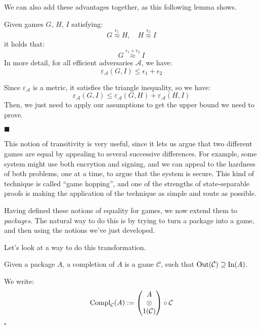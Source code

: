 We can also add these advantages together, as this following
lemma shows.

\begin{lemma}
    Given games $G$, $H$, $I$ satisfying:
    $$
    G \overset{\epsilon_1}{\approx} H, \quad H \overset{\epsilon_2}{\approx} I
    $$
    it holds that:
    $$
    G \overset{\epsilon_1 + \epsilon_2}{\approx} I
    $$
    In more detail, for all efficient adversaries $\mathcal{A}$, we have:
    $$
    \varepsilon_{\mathcal{A}}(G, I) \leq \epsilon_1 + \epsilon_2
    $$

     Since $\varepsilon_{\mathcal{A}}$ is a metric, it
    satisfies the triangle inequality, so we have:
    $$
    \varepsilon_{\mathcal{A}}(G, I) \leq \varepsilon_{\mathcal{A}}(G, H) + \varepsilon_{\mathcal{A}}(H, I)
    $$
    Then, we just need to apply our assumptions to get the upper bound we 
    need to prove.

    $\blacksquare$
\end{lemma}

This notion of transitivity is very useful, since it lets us argue
that two different games are equal by appealing to several successive
differences.
For example, some system might use both encrytion and signing,
and we can appeal to the hardness of both problems, one at a time,
to argue that the system is secure.
This kind of technique is called ``game hopping'',
and one of the strengths of state-separable proofs is making
the application of the technique as simple and route as possible.

Having defined these notions of equality for games,
we now extend them to \emph{packages}.
The natural way to do this is by trying to turn
a package into a game, and then using the notions we've just developed.

Let's look at a way to do this transformation.

\begin{definition}[Completion]
    Given a package $A$, a completion of $A$ is a game $\mathcal{C}$,
    such that $\text{Out}(\mathcal{C}) \supseteq \text{In}(A)$.

    We write:
    $$
    \text{Compl}_{\mathcal{C}}(A) := \begin{pmatrix}
        A\cr
        \otimes\cr
        1(\mathcal{C})
    \end{pmatrix}
    \circ \mathcal{C}
    $$

    $\square$
\end{definition}

